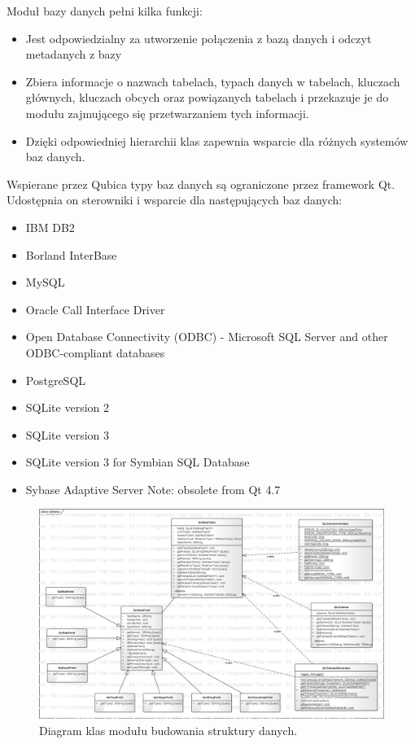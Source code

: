 \documentclass[12pt]{report}
\begin{document}
Moduł bazy danych pełni kilka funkcji:
\begin{itemize}
\item{Jest odpowiedzialny za utworzenie połączenia z bazą danych i odczyt metadanych z bazy}
\item{Zbiera informacje o nazwach tabelach, typach danych w tabelach, kluczach głównych, kluczach obcych oraz powiązanych tabelach i przekazuje je do modułu zajmującego się przetwarzaniem tych informacji.}
\item{Dzięki odpowiedniej hierarchii klas zapewnia wsparcie dla różnych systemów baz danych. }
\end{itemize}

Wspierane przez Qubica typy baz danych są ograniczone przez framework Qt. Udostępnia on sterowniki i wsparcie dla następujących baz danych:
\begin{itemize}
\item{IBM DB2}
\item{Borland InterBase}
\item{MySQL}
\item{Oracle Call Interface Driver}
\item{Open Database Connectivity (ODBC) - Microsoft SQL Server and other ODBC-compliant databases}
\item{PostgreSQL}
\item{SQLite version 2}
\item{SQLite version 3}
\item{SQLite version 3 for Symbian SQL Database}
\item{Sybase Adaptive Server Note: obsolete from Qt 4.7}
\end{itemize}

\begin{figure}[h]
	\centering
	\includegraphics[width=1.1\textwidth]{images/schema.png}
	\caption{Diagram klas modułu budowania struktury danych.}
\end{figure}
\FloatBarrier	
\end{document}
